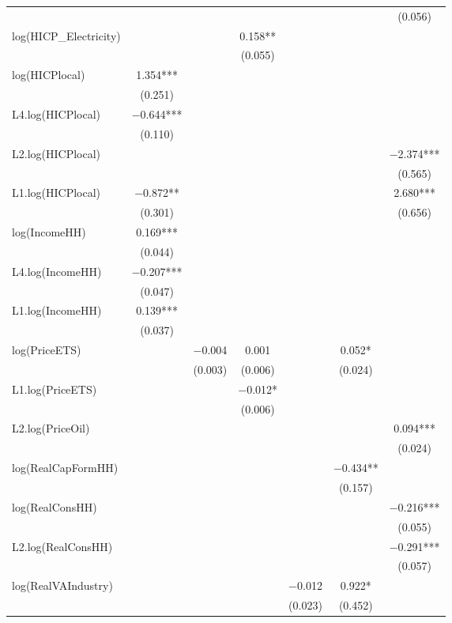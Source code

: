 \begin{table}
{\begin{tabular}[t]{lcccccc}
 &  &  &  &  &  & (\num{0.056})\\
log(HICP\_Electricity) &  &  & \num{0.158}** &  &  & \\
 &  &  & (\num{0.055}) &  &  & \\
log(HICPlocal) & \num{1.354}*** &  &  &  &  & \\
 & (\num{0.251}) &  &  &  &  & \\
L4.log(HICPlocal) & \num{-0.644}*** &  &  &  &  & \\
 & (\num{0.110}) &  &  &  &  & \\
L2.log(HICPlocal) &  &  &  &  &  & \num{-2.374}***\\
 &  &  &  &  &  & (\num{0.565})\\
L1.log(HICPlocal) & \num{-0.872}** &  &  &  &  & \num{2.680}***\\
 & (\num{0.301}) &  &  &  &  & (\num{0.656})\\
log(IncomeHH) & \num{0.169}*** &  &  &  &  & \\
 & (\num{0.044}) &  &  &  &  & \\
L4.log(IncomeHH) & \num{-0.207}*** &  &  &  &  & \\
 & (\num{0.047}) &  &  &  &  & \\
L1.log(IncomeHH) & \num{0.139}*** &  &  &  &  & \\
 & (\num{0.037}) &  &  &  &  & \\
log(PriceETS) &  & \num{-0.004} & \num{0.001} &  & \num{0.052}* & \\
 &  & (\num{0.003}) & (\num{0.006}) &  & (\num{0.024}) & \\
L1.log(PriceETS) &  &  & \num{-0.012}* &  &  & \\
 &  &  & (\num{0.006}) &  &  & \\
L2.log(PriceOil) &  &  &  &  &  & \num{0.094}***\\
 &  &  &  &  &  & (\num{0.024})\\
log(RealCapFormHH) &  &  &  &  & \num{-0.434}** & \\
 &  &  &  &  & (\num{0.157}) & \\
log(RealConsHH) &  &  &  &  &  & \num{-0.216}***\\
 &  &  &  &  &  & (\num{0.055})\\
L2.log(RealConsHH) &  &  &  &  &  & \num{-0.291}***\\
 &  &  &  &  &  & (\num{0.057})\\
log(RealVAIndustry) &  &  &  & \num{-0.012} & \num{0.922}* & \\
 &  &  &  & (\num{0.023}) & (\num{0.452}) & \\

\end{tabular}}
\end{table}
